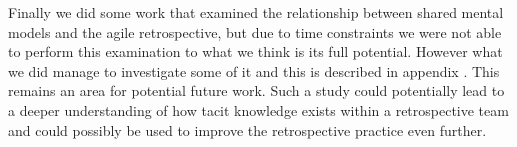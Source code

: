 Finally we did some work that examined the relationship between shared mental models and the agile retrospective, but due to time constraints we were not able to perform this examination to what we think is its full potential. However what we did manage to investigate some of it and this is described in appendix \label{app:smm}. This remains an area for potential future work. Such a study could potentially lead to a deeper understanding of how tacit knowledge exists within a retrospective team and could possibly be used to improve the retrospective practice even further. 

